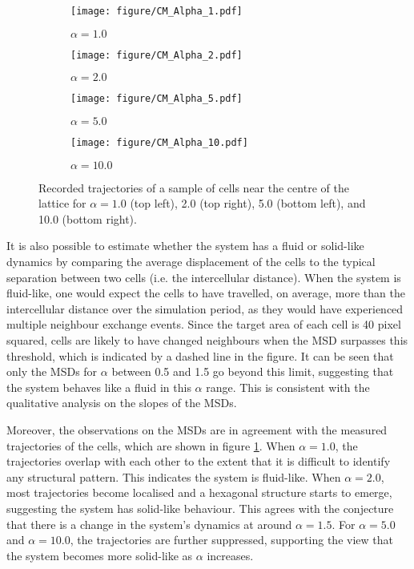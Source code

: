 \documentclass[a4paper,12pt]{article}
\begin{document}
\begin{figure}[h]
\centering
\begin{subfigure}[h]{0.496\textwidth}
\texttt{[image: figure/CM\_Alpha\_1.pdf]}
\caption*{$\alpha = 1.0$}
\end{subfigure}
\begin{subfigure}[h]{0.496\textwidth}
\texttt{[image: figure/CM\_Alpha\_2.pdf]}
\caption*{$\alpha = 2.0$}
\end{subfigure}
\begin{subfigure}[h]{0.496\textwidth}
\texttt{[image: figure/CM\_Alpha\_5.pdf]}
\caption*{$\alpha = 5.0$}
\end{subfigure}
\begin{subfigure}[h]{0.496\textwidth}
\texttt{[image: figure/CM\_Alpha\_10.pdf]}
\caption*{$\alpha = 10.0$}
\end{subfigure}
\caption{Recorded trajectories of a sample of cells near the centre of the lattice for $\alpha = 1.0$ (top left), 2.0 (top right), 5.0 (bottom left), and 10.0 (bottom right). }
\label{fig:cmalpha}
\end{figure}
\FloatBarrier

It is also possible to estimate whether the system has a fluid or solid-like dynamics by comparing the average displacement of the cells to the typical separation between two cells (i.e. the intercellular distance). When the system is fluid-like, one would expect the cells to have travelled, on average, more than the intercellular distance over the simulation period, as they would have experienced multiple neighbour exchange events. Since the target area of each cell is 40 pixel squared, cells are likely to have changed neighbours when the MSD surpasses this threshold, which is indicated by a dashed line in the figure. It can be seen that only the MSDs for $\alpha$ between 0.5 and 1.5 go beyond this limit, suggesting that the system behaves like a fluid in this $\alpha$ range. This is consistent with the qualitative analysis on the slopes of the MSDs.  


Moreover, the observations on the MSDs are in agreement with the measured trajectories of the cells, which are shown in figure \ref{fig:cmalpha}. When $\alpha = 1.0$, the trajectories overlap with each other to the extent that it is difficult to identify any structural pattern. This indicates the system is fluid-like. When $\alpha = 2.0$, most trajectories become localised and a hexagonal structure starts to emerge, suggesting the system has solid-like behaviour. This agrees with the conjecture that there is a change in the system's dynamics at around $\alpha = 1.5$. For $\alpha = 5.0$ and $\alpha = 10.0$, the trajectories are further suppressed, supporting the view that the system becomes more solid-like as $\alpha$ increases. 
\end{document}
